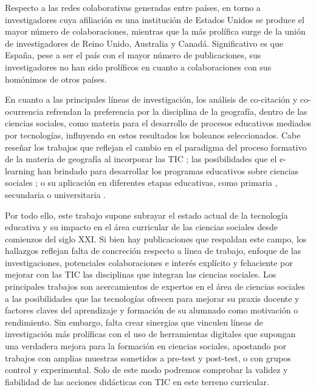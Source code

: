 \documentclass[spanish]{textolivre}
\begin{document}
Respecto a las redes colaborativas generadas entre países, en torno a investigadores cuya afiliación es una institución de Estados Unidos se produce el mayor número de colaboraciones, mientras que la más prolífica surge de la unión de investigadores de Reino Unido, Australia y Canadá. Significativo es que España, pese a ser el país con el mayor número de publicaciones, sus investigadores no han sido prolíficos en cuanto a colaboraciones con sus homónimos de otros países.

En cuanto a las principales líneas de investigación, los análisis de co-citación y co-ocurrencia refrendan la preferencia por la disciplina de la geografía, dentro de las ciencias sociales, como materia para el desarrollo de procesos educativos mediados por tecnologías, influyendo en estos resultados los boleanos seleccionados. Cabe reseñar los trabajos que reflejan el cambio en el paradigma del proceso formativo de la materia de geografía al incorporar las TIC \cite{hillis2005ict, piotrowska2019challenges, svobodova2016model}; las posibilidades que el e-learning han brindado para desarrollar los programas educativos sobre ciencias sociales \cite{bosco2011virtual, lynch2008learning, mendler2002virtual}; o su aplicación en diferentes etapas educativas, como primaria \cite{deaney2009case, grigoriou, villena2019strolling}, secundaria \cite{arancibia2013caracterizacion, arancibia2015concepciones, biddulph, garcia2015aproximacion} o universitaria \cite{miralles2019digital, ortega2019massive}.

Por todo ello, este trabajo supone subrayar el estado actual de la tecnología educativa y su impacto en el área curricular de las ciencias sociales desde comienzos del siglo XXI. Si bien hay publicaciones que respaldan este campo, los hallazgos reflejan falta de concreción respecto a línea de trabajo, enfoque de las investigaciones, potenciales colaboraciones e interés explícito y fehaciente por mejorar con las TIC las disciplinas que integran las ciencias sociales. Los principales trabajos son acercamientos de expertos en el área de ciencias sociales a las posibilidades que las tecnologías ofrecen para mejorar su praxis docente y factores claves del aprendizaje y formación de su alumnado como motivación o rendimiento. Sin embargo, falta crear sinergias que vinculen líneas de investigación más prolíficas con el uso de herramientas digitales que supongan una verdadera mejora para la formación en ciencias sociales, apostando por trabajos con amplias muestras sometidos a pre-test y post-test, o con grupos control y experimental. Solo de este modo podremos comprobar la validez y fiabilidad de las acciones didácticas con TIC en este terreno curricular.
\end{document}
